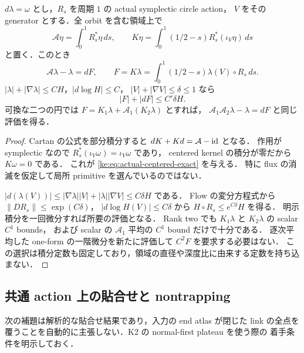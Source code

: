 \begin{lemma}
\label{ke:actual-centered-primitive-weighted}
$d\lambda=\omega$ とし，$R_s$ を周期 $1$ の actual symplectic circle action，
$V$ をその generator とする．全 orbit を含む領域上で
\[
 \mathcal A\eta=\int_0^1R_s^*\eta\,ds,
 \qquad K\eta=\int_0^1(1/2-s)R_s^*(\iota_V\eta)\,ds
\]
と置く．このとき
\begin{equation}\label{ke:eq:actual-centered-exact}
 \mathcal A\lambda-\lambda=dF,
 \qquad F=K\lambda
   =\int_0^1(1/2-s)\lambda(V)\circ R_s\,ds.
\end{equation}
$|\lambda|+|\nabla\lambda|\le CH$，$|d\log H|\le C$，
$|V|+|\nabla V|\le\delta\le1$ なら
\begin{equation}\label{ke:eq:centered-F-weighted-bound}
 |F|+|dF|\le C'\delta H.
\end{equation}
可換な二つの円では
$F=K_1\lambda+\mathcal A_1(K_2\lambda)$ とすれば，
$\mathcal A_1\mathcal A_2\lambda-\lambda=dF$ と同じ評価を得る．
\end{lemma}

\begin{proof}
Cartan の公式を部分積分すると
$dK+Kd=\mathcal A-\operatorname{id}$ となる．
作用が symplectic なので $R_s^*(\iota_V\omega)=\iota_V\omega$ であり，
centered kernel の積分が零だから $K\omega=0$ である．
これが \eqref{ke:eq:actual-centered-exact} を与える．
特に flux の消滅を仮定して局所 primitive を選んでいるのではない．

$|d(\lambda(V))|\le|\nabla\lambda||V|+|\lambda||\nabla V|
\le C\delta H$ である．
Flow の変分方程式から $\|DR_s\|\le\exp(C\delta)$，
$|d\log H(V)|\le C\delta$ から
$H\circ R_s\le e^{C\delta}H$ を得る．
明示積分を一回微分すれば所要の評価となる．
Rank two でも $K_1\lambda$ と $K_2\lambda$ の scalar $C^1$ bounds，
および scalar の $\mathcal A_1$ 平均の $C^1$ bound だけで十分である．
逐次平均した one-form の一階微分を新たに評価して $C^2F$ を要求する必要はない．
この選択は積分定数も固定しており，領域の直径や深度比に由来する定数を持ち込まない．
\end{proof}

\subsection{共通 action 上の貼合せと nontrapping}

次の補題は解析的な貼合せ結果であり，入力の end atlas が閉じた link の全点を
覆うことを自動的に主張しない．K2 の normal-first plateau を使う際の
着手条件を明示しておく．

